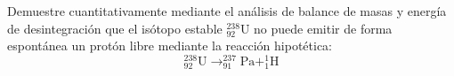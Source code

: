 \item Demuestre cuantitativamente mediante el análisis de balance de masas y energía de desintegración que el isótopo estable $^{238}_{92}\text{U}$ no puede emitir de forma espontánea un protón libre mediante la reacción hipotética:
$$ ^{238}_{92}\text{U} \to ^{237}_{91}\text{Pa} + ^{1}_{1}\text{H} $$